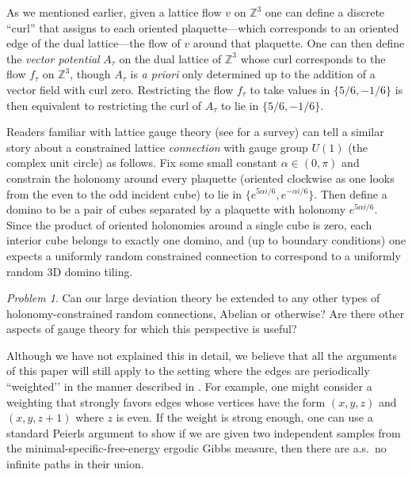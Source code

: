 \documentclass[11pt]{article}
\theoremstyle{remark}
\newtheorem{problem}[thm]{Problem}
\theoremstyle{definition}
\begin{document}
As we mentioned earlier, given a lattice flow $v$ on $\mathbb Z^3$ one can define a discrete ``curl'' that assigns to each oriented plaquette---which corresponds to an oriented edge of the dual lattice---the flow of $v$ around that plaquette.  One can then define the {\em vector potential} $A_\tau$ on the dual lattice of $\mathbb Z^3$ whose curl corresponds to the flow $f_\tau$ on $\mathbb Z^3$, though $A_\tau$ is {\em a priori} only determined up to the addition of a vector field with curl zero. Restricting the flow $f_\tau$ to take values in $\{5/6,-1/6\}$ is then equivalent to restricting the curl of $A_\tau$ to lie in $\{5/6,-1/6\}$.

Readers familiar with lattice gauge theory (see \cite{chatterjee2019yang} for a survey) can tell a similar story about a constrained lattice {\em connection} with gauge group $U(1)$ (the complex unit circle) as follows.  Fix some small constant $\alpha \in (0,\pi)$ and constrain the holonomy around every plaquette (oriented clockwise as one looks from the even to the odd incident cube) to lie in $\{e^{5 \alpha i / 6}, e^{-\alpha i /6} \}$.  Then define a domino to be a pair of cubes separated by a plaquette with holonomy $e^{5 \alpha i / 6}$. Since the product of oriented holonomies around a single cube is zero, each interior cube belongs to exactly one domino, and (up to boundary conditions) one expects a uniformly random constrained connection to correspond to a uniformly random 3D domino tiling. 

\begin{problem} \label{prob:gauge}
Can our large deviation theory be extended to any other types of holonomy-constrained random connections, Abelian or otherwise? Are there other aspects of gauge theory for which this perspective is useful?
\end{problem}

Although we have not explained this in detail, we believe that all the arguments of this paper will still apply to the setting where the edges are periodically ``weighted’’ in the manner described in \cite{kenyon2006dimers}.  For example, one might consider a weighting that strongly favors edges whose vertices have the form $(x,y,z)$ and $(x,y,z+1)$ where $z$ is even. If the weight is strong enough, one can use a standard Peierls argument to show if we are given two independent samples from the minimal-specific-free-energy ergodic Gibbs measure, then there are a.s.\ no infinite paths in their union.
\end{document}

